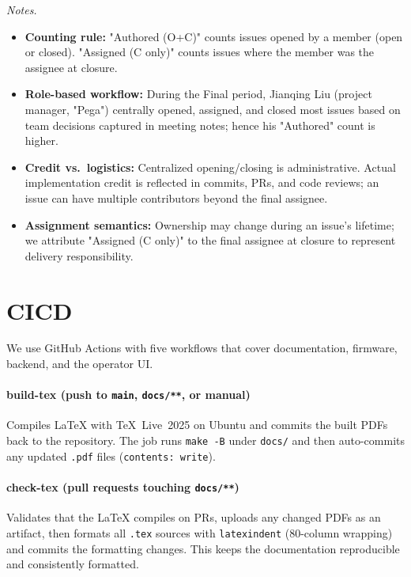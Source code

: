 \documentclass{article}
\begin{document}
\noindent\textit{Notes.}
\begin{itemize}
  \item \textbf{Counting rule:} "Authored (O+C)" counts issues opened by a member (open or closed). "Assigned (C only)" counts issues where the member was the assignee at closure.
  \item \textbf{Role-based workflow:} During the Final period, Jianqing Liu (project manager, "Pega") centrally opened, assigned, and closed most issues based on team decisions captured in meeting notes; hence his "Authored" count is higher.
  \item \textbf{Credit vs.\ logistics:} Centralized opening/closing is administrative. Actual implementation credit is reflected in commits, PRs, and code reviews; an issue can have multiple contributors beyond the final assignee.
  \item \textbf{Assignment semantics:} Ownership may change during an issue's lifetime; we attribute "Assigned (C only)" to the final assignee at closure to represent delivery responsibility.
\end{itemize}

\section{CICD}


We use GitHub Actions with five workflows that cover documentation, firmware,
backend, and the operator UI.

\paragraph{build-tex (push to \texttt{main}, \texttt{docs/**}, or manual)}
Compiles LaTeX with TeX~Live~2025 on Ubuntu and commits the built PDFs back to the repository.
The job runs \texttt{make -B} under \texttt{docs/} and then auto-commits any updated \texttt{.pdf} files
(\texttt{contents: write}).

\paragraph{check-tex (pull requests touching \texttt{docs/**})}
Validates that the LaTeX compiles on PRs, uploads any changed PDFs as an artifact, then formats all
\texttt{.tex} sources with \texttt{latexindent} (80-column wrapping) and commits the formatting changes.
This keeps the documentation reproducible and consistently formatted.
\end{document}
